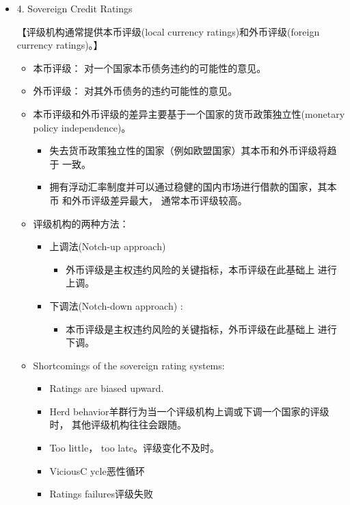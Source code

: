 \begin{itemize}
\item 4. Sovereign Credit Ratings

【评级机构通常提供本币评级(local currency ratings)和外币评级(foreign currency ratings)。】

\begin{itemize}
    \item 本币评级： 对一个国家本币债务违约的可能性的意见。
    \item 外币评级： 对其外币债务的违约可能性的意见。
    \item 本币评级和外币评级的差异主要基于一个国家的货币政策独立性(monetary policy independence)。
    \begin{itemize}
        \item 失去货币政策独立性的国家（例如欧盟国家）其本币和外币评级将趋于
        一致。
        \item  拥有浮动汇率制度并可以通过稳健的国内市场进行借款的国家，其本币
        和外币评级差异最大， 通常本币评级较高。
    \end{itemize}
    \item 评级机构的两种方法：
    \begin{itemize}
        \item 上调法(Notch-up approach)
        \begin{itemize}
            \item 外币评级是主权违约风险的关键指标，本币评级在此基础上
            进行上调。
        \end{itemize}
        \item 下调法(Notch-down approach) :
        \begin{itemize}
            \item 本币评级是主权违约风险的关键指标，外币评级在此基础上
            进行下调。
        \end{itemize}
    \end{itemize}
    \item Shortcomings of the sovereign rating systems:
    \begin{itemize}
        \item Ratings are biased upward.
        \item  Herd behavior羊群行为当一个评级机构上调或下调一个国家的评级时，
        其他评级机构往往会跟随。
        \item  Too little， too late。评级变化不及时。
        \item ViciousC ycle恶性循环
        \item  Ratings failures评级失败
    \end{itemize}
    

\end{itemize}
\end{itemize}
